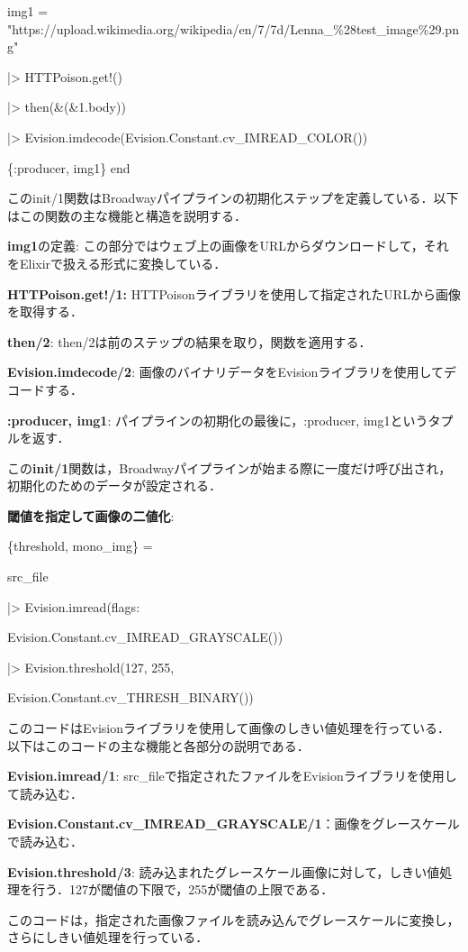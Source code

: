 \documentclass[a4paper]{jreport}	%
\begin{document}
    img1 = 
      "https://upload.wikimedia.org/wikipedia/en/7/7d/Lenna\_\%28test\_image\%29.png"
      
  |> HTTPoison.get!()
  
  |> then(\&(\&1.body))
  
  |> Evision.imdecode(Evision.Constant.cv\_IMREAD\_COLOR()) 
  
  \{:producer, img1\}
end

このinit/1関数はBroadwayパイプラインの初期化ステップを定義している．以下はこの関数の主な機能と構造を説明する．

\textbf{img1}の定義: この部分ではウェブ上の画像をURLからダウンロードして，それをElixirで扱える形式に変換している．

\textbf{HTTPoison.get!/1:} HTTPoisonライブラリを使用して指定されたURLから画像を取得する．

\textbf{then/2}: then/2は前のステップの結果を取り，関数を適用する．

\textbf{Evision.imdecode/2}: 画像のバイナリデータをEvisionライブラリを使用してデコードする．

\textbf{{:producer, img1}}: パイプラインの初期化の最後に，{:producer, img1}というタプルを返す．

この\textbf{init/1}関数は，Broadwayパイプラインが始まる際に一度だけ呼び出され，初期化のためのデータが設定される．

\textbf{閾値を指定して画像の二値化}:

\{threshold, mono\_img\} =

  src\_file

  |> Evision.imread(flags:
  
  Evision.Constant.cv\_IMREAD\_GRAYSCALE())
  
  |> Evision.threshold(127, 255, 
  
  Evision.Constant.cv\_THRESH\_BINARY())

このコードはEvisionライブラリを使用して画像のしきい値処理を行っている．以下はこのコードの主な機能と各部分の説明である．

\textbf{Evision.imread/1}: src\_fileで指定されたファイルをEvisionライブラリを使用して読み込む．

\textbf{Evision.Constant.cv\_IMREAD\_GRAYSCALE/1}：画像をグレースケールで読み込む．

\textbf{Evision.threshold/3}: 読み込まれたグレースケール画像に対して，しきい値処理を行う．127が閾値の下限で，255が閾値の上限である．

このコードは，指定された画像ファイルを読み込んでグレースケールに変換し，さらにしきい値処理を行っている．
\end{document}
